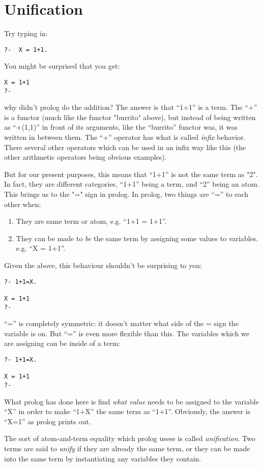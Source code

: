 \documentclass{book}[9pt]
\begin{document}
\section{Unification}

Try typing in:
\begin{verbatim}
?-  X = 1+1.
\end{verbatim}
\noindent You might be surprised that you get:
\begin{verbatim}
X = 1+1
?- 
\end{verbatim}
\noindent why didn't prolog do the addition?  The answer is that
``1+1'' is a term.  The ``+'' is a functor (much like the functor
"burrito" above), but instead of being written as ``+(1,1)'' in front
of its arguments, like the ``burrito'' functor was, it was written in
between them.  The ``+'' operator has what is called {\em infix}
behavior.  There several other operators which can be used in an infix
way like this (the other arithmetic operators being obvious examples).

But for our present purposes, this means that ``1+1'' is not the same
term as "2".  In fact, they are different categories, ``1+1'' being a
term, and ``2'' being an atom.  This brings us to the "=" sign in
prolog.  In prolog, two things are ``='' to each other when:
\begin{enumerate}
\item They are same term or atom, e.g. ``1+1 = 1+1''.
\item They can be made to {\em be} the same term by assigning some
 values to variables. e.g. ``X = 1+1''.
\end{enumerate}
\noindent Given the above, this behaviour shouldn't be surprising to you:
\begin{verbatim}
?- 1+1=X.

X = 1+1
?- 
\end{verbatim}
\noindent ``='' is completely symmetric: it doesn't matter what side
of the = sign the variable is on.  But ``='' is even more flexible
than this.  The variables which we are assigning can be inside of a
term:
\begin{verbatim}
?- 1+1=X.

X = 1+1
?- 
\end{verbatim}
\noindent What prolog has done here is find {\em what value} needs to
be assigned to the variable ``X'' in order to make ``1+X'' the same
term as ``1+1''.  Obviously, the answer is ``X=1'' as prolog prints
out.

The sort of atom-and-term equality which prolog usese is called 
{\em unification}.  Two terms are said to {\em unify} if they are already
the same term, or they can be made into the same term by instantiating
any variables they contain.
\end{document}
